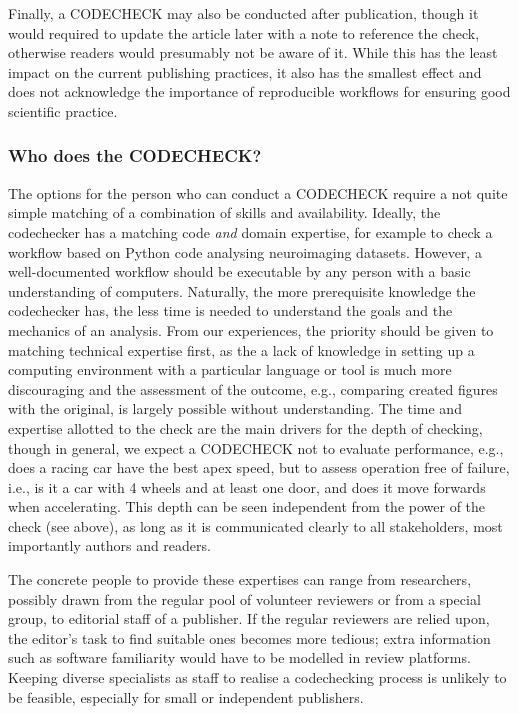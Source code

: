 \documentclass[12pt]{article}
\begin{document}
Finally, a CODECHECK may also be conducted after publication, though it
would required to update the article later with a note to reference the check,
otherwise readers would presumably not be aware of it. While this has the
least impact on the current publishing practices, it also has the smallest
effect and does not acknowledge the importance of reproducible workflows for
ensuring good scientific practice.

\subsubsection*{Who does the CODECHECK?}\label{who-does-the-codecheck}

The options for the person who can conduct a CODECHECK require a not quite
simple matching of a combination of skills and availability. Ideally, the
codechecker has a matching code \emph{and} domain expertise, for example to
check a workflow based on Python code analysing neuroimaging datasets. However,
a well-documented workflow should be executable by any person with a basic
understanding of computers. Naturally, the more prerequisite knowledge the
codechecker has, the less time is needed to understand the goals and 
the mechanics of an analysis. From our experiences, the priority should be
given to matching technical expertise first, as the a lack of knowledge in
setting  up a computing environment with a particular language or tool is 
much more discouraging and the assessment of the outcome, e.g., comparing
created figures with the original, is largely possible without 
understanding.
The time and expertise allotted to the check
are the main drivers for the depth of checking, though in general, we 
expect a CODECHECK not to evaluate performance, e.g., does a racing car
have the best apex speed, but to assess operation free of failure, i.e., 
is it a car with 4 wheels and at least one door, and does it move forwards
when accelerating. This depth can be seen independent from the power of
the check (see above), as long as it is communicated clearly to all
stakeholders, most importantly authors and readers.

The concrete people to provide these expertises can range from researchers,
possibly drawn from the regular pool of volunteer reviewers or from a 
special group, to editorial staff of a publisher. If the regular reviewers
are relied upon, the editor's task to find suitable ones becomes more
tedious; extra information such as software familiarity would have to be
modelled in review platforms. Keeping diverse specialists as staff to
realise a codechecking process is unlikely to be feasible, especially for 
small or independent publishers.
\end{document}

